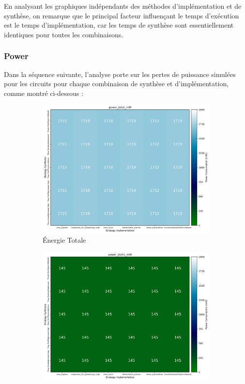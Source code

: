 \documentclass[../CSC_5RO07_TA.tex]{subfiles}
\begin{document}
\noindent En analysant les graphiques indépendants des méthodes d'implémentation et de synthèse, on remarque que le principal facteur influençant le temps d'exécution est le temps d'implémentation, car les temps de synthèse sont essentiellement identiques pour toutes les combinaisons.


\subsubsection{Power}
\noindent Dans la séquence suivante, l'analyse porte sur les pertes de puissance simulées pour les circuits pour chaque combinaison de synthèse et d'implémentation, comme montré ci-dessous :
\begin{figure}[h]
    \centering
    \begin{subfigure}[b]{0.30\textwidth}
        \centering
        \includegraphics[width=\linewidth]{images/2_power_total_mW.png}
        \caption{Énergie Totale}
        \label{fig:power_total_2}
    \end{subfigure}\hfill
	\begin{subfigure}[b]{0.30\textwidth}
        \centering
        \includegraphics[width=\linewidth]{images/2_power_static_mW.png}

\end{subfigure}
\end{figure}
\end{document}
